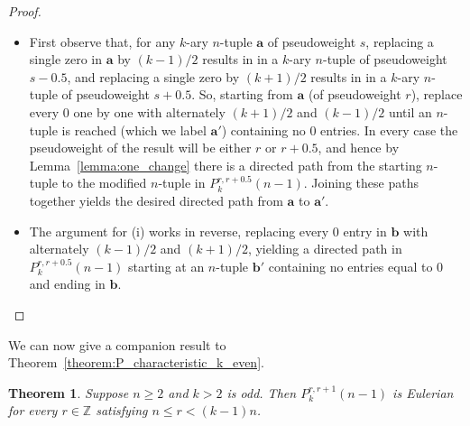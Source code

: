 \documentclass[a4paper,11pt]{article}
\theoremstyle{plain}
\newtheorem{theorem}[lemma]{Theorem}
\theoremstyle{definition}
\theoremstyle{remark}
\begin{document}
\begin{proof}
\begin{itemize}
\item[(i)]  First observe that, for any $k$-ary $n$-tuple $\mathbf{a}$ of pseudoweight $s$,
    replacing a single zero in $\mathbf{a}$ by $(k-1)/2$ results in in a $k$-ary $n$-tuple
    of pseudoweight $s-0.5$, and replacing a single zero by $(k+1)/2$ results in in a
    $k$-ary $n$-tuple of pseudoweight $s+0.5$. So, starting from $\mathbf{a}$ (of
    pseudoweight $r$), replace every $0$ one by one with alternately $(k+1)/2$ and
    $(k-1)/2$ until an $n$-tuple is reached (which we label $\mathbf{a}'$) containing no
    $0$ entries. In every case the pseudoweight of the result will be either $r$ or
    $r+0.5$, and hence by Lemma~\ref{lemma:one_change} there is a directed path from the
    starting $n$-tuple to the modified $n$-tuple in $P_k^{r,r+0.5}(n-1)$.  Joining these
    paths together yields the desired directed path from $\mathbf{a}$ to $\mathbf{a}'$.
\item[(ii)] The argument for (i) works in reverse, replacing every $0$ entry in
    $\mathbf{b}$ with alternately $(k-1)/2$ and $(k+1)/2$, yielding a directed path in
    $P_k^{r,r+0.5}(n-1)$ starting at an $n$-tuple $\mathbf{b}'$ containing no entries equal
    to $0$ and ending in $\mathbf{b}$.
\end{itemize}
\end{proof}

We can now give a companion result to Theorem~\ref{theorem:P_characteristic_k_even}.

\begin{theorem} \label{theorem:P_characteristic_k_odd}
Suppose $n\geq2$ and $k>2$ is odd. Then $P_k^{r,r+1}(n-1)$ is Eulerian for every $r\in \mathbb{Z}$
satisfying $n\leq r<(k-1)n$.
\end{theorem}
\end{document}
